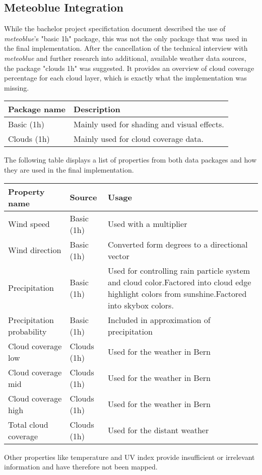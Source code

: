 \subsection{Meteoblue Integration}
\label{section:techimpl:meteoblue}
While the bachelor project specifictation document described the use of \emph{meteoblue}'s "basic 1h" package, this was not the only package that was used in the final implementation.
After the cancellation of the technical interview with \emph{meteoblue} and further research into additional, available weather data sources, the package "clouds 1h" was suggested.
It provides an overview of cloud coverage percentage for each cloud layer, which is exactly what the implementation was missing.
\emptyline
\begin{tabularx}{\linewidth}{|l|X|}
    \hline
    \textbf{Package name}   & \textbf{Description} \\ \hline
    Basic (1h)              & Mainly used for shading and visual effects. \\ \hline
    Clouds (1h)             & Mainly used for cloud coverage data. \\ \hline
\end{tabularx}
\emptyline
The following table displays a list of properties from both data packages and how they are used in the final implementation.
\emptyline
\begin{tabularx}{\linewidth}{|l|l|X|}
    \hline
    \textbf{Property name}      & \textbf{Source}     & \textbf{Usage}                                 \\ \hline
    Wind speed                  & Basic (1h)          & Used with a multiplier                         \\ \hline
    Wind direction              & Basic (1h)          & Converted form degrees to a directional vector \\ \hline
    Precipitation               & Basic (1h)          & Used for controlling rain particle system and cloud color.\newline Factored into cloud edge highlight colors from sunshine.\newline Factored into skybox colors. \\ \hline
    Precipitation probability   & Basic (1h)          & Included in approximation of precipitation     \\ \hline
    Cloud coverage low          & Clouds (1h)         & Used for the weather in Bern                   \\ \hline
    Cloud coverage mid          & Clouds (1h)         & Used for the weather in Bern                   \\ \hline
    Cloud coverage high         & Clouds (1h)         & Used for the weather in Bern                   \\ \hline
    Total cloud coverage        & Clouds (1h)         & Used for the distant weather                   \\ \hline
\end{tabularx}
\emptyline
Other properties like temperature and UV index provide insufficient or irrelevant information and have therefore not been mapped.

